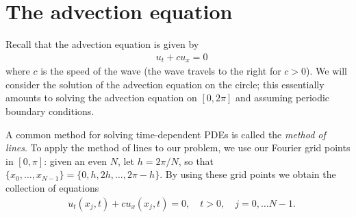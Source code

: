 
% 
% 
% 
% 


\section*{The advection equation}
Recall that the advection equation is given by
\begin{align}
&{ }u_t + cu_x = 0
\end{align}
where $c$ is the speed of the wave (the wave travels to the right for $c > 0$).
We will consider the solution of the advection equation on the circle; this essentially amounts to solving the advection equation on $[0,2\pi]$ and assuming periodic boundary conditions. 

A common method for solving time-dependent PDEs is called the \textit{method of lines}. To apply the method of lines to our problem, we use our Fourier grid points in $[0,\pi]$: given an even $N$, let $h = 2\pi/N$, so that $\{x_0,\ldots,x_{N-1}\} = \{0,h,2h,\ldots,2\pi-h\}$.  By using these grid points we obtain the collection of equations
\begin{align}
&{ }u_t(x_j,t) + cu_x(x_j,t) = 0, \quad t >0, \quad j = 0, \ldots N-1. \label{spectral2:method_oflines}
\end{align}

